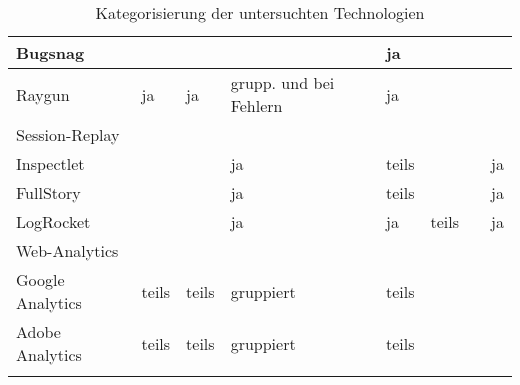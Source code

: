 \begin{longtable}{|p{4.10cm}|p{0.90cm}|p{0.90cm}|p{1.9cm}|p{1.75cm}|p{1.5cm}|p{1.4cm}|p{1.3cm}|}
\hline
Bugsnag &  &  &  & ja &  &  &  \\
\hline
Raygun & ja & ja & grupp. und bei \mbox{Fehlern} & ja &  &  &  \\
\hline
\hline
\multicolumn{8}{|l|}{Session-Replay} \\
\hline
Inspectlet &  &  & ja & teils &  &  & ja \\
\hline
FullStory &  &  & ja & teils &  &  & ja \\
\hline
LogRocket &  &  & ja & ja & teils &  & ja \\
\hline
\hline
\multicolumn{8}{|l|}{Web-Analytics} \\
\hline
Google Analytics & teils & teils & gruppiert & teils &  &  &  \\
\hline
Adobe Analytics & teils & teils & gruppiert & teils &  &  &  \\
\hline
\caption{Kategorisierung der untersuchten Technologien}
\label{tab:technologie-kategorisierung}
\end{longtable}
\endgroup
